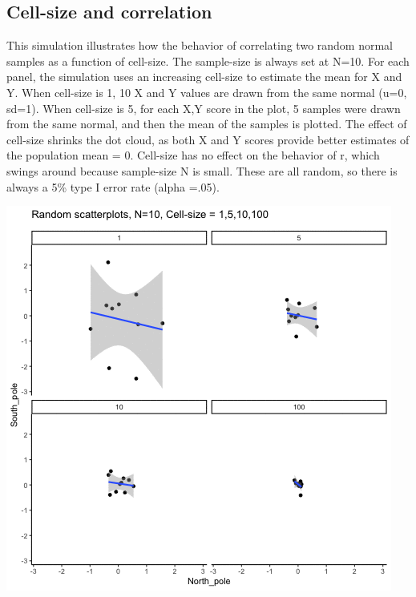 \documentclass[
]{book}
\begin{document}
\hypertarget{cell-size-and-correlation}{%
\subsection{Cell-size and correlation}\label{cell-size-and-correlation}}

This simulation illustrates how the behavior of correlating two random normal samples as a function of cell-size. The sample-size is always set at N=10. For each panel, the simulation uses an increasing cell-size to estimate the mean for X and Y. When cell-size is 1, 10 X and Y values are drawn from the same normal (u=0, sd=1). When cell-size is 5, for each X,Y score in the plot, 5 samples were drawn from the same normal, and then the mean of the samples is plotted. The effect of cell-size shrinks the dot cloud, as both X and Y scores provide better estimates of the population mean = 0. Cell-size has no effect on the behavior of r, which swings around because sample-size N is small. These are all random, so there is always a 5\% type I error rate (alpha =.05).

\includegraphics{gifs/cellsizeCor-1.gif}
\end{document}
